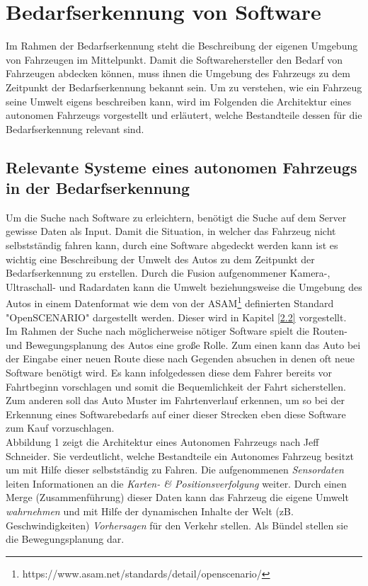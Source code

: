 \section{Bedarfserkennung von Software}
Im Rahmen der Bedarfserkennung steht die Beschreibung der eigenen Umgebung von Fahrzeugen im Mittelpunkt. Damit die Softwarehersteller den Bedarf von Fahrzeugen abdecken können, muss ihnen die Umgebung des Fahrzeugs zu dem Zeitpunkt der Bedarfserkennung bekannt sein. Um zu verstehen, wie ein Fahrzeug seine Umwelt eigens beschreiben kann, wird im Folgenden die Architektur eines autonomen Fahrzeugs vorgestellt und erläutert, welche Bestandteile dessen für die Bedarfserkennung relevant sind. 
\subsection{Relevante Systeme eines autonomen Fahrzeugs in der Bedarfserkennung}
Um die Suche nach Software zu erleichtern, benötigt die Suche auf dem Server gewisse Daten als Input. Damit die Situation, in welcher das Fahrzeug nicht selbstständig fahren kann, durch eine Software abgedeckt werden kann ist es wichtig eine Beschreibung der Umwelt des Autos zu dem Zeitpunkt der Bedarfserkennung zu erstellen. Durch die Fusion aufgenommener Kamera-, Ultraschall- und Radardaten kann die Umwelt beziehungsweise die Umgebung des Autos in einem Datenformat wie dem von der ASAM\footnote[1.]{https://www.asam.net/standards/detail/openscenario/} definierten Standard "OpenSCENARIO"\cite{b35} dargestellt werden. Dieser wird in Kapitel \ref{2.2} vorgestellt.\\
Im Rahmen der Suche nach möglicherweise nötiger Software spielt die Routen- und Bewegungsplanung des Autos eine große Rolle. Zum einen kann das Auto bei der Eingabe einer neuen Route diese nach Gegenden absuchen in denen oft neue Software benötigt wird. Es kann infolgedessen diese dem Fahrer bereits vor Fahrtbeginn vorschlagen und somit die Bequemlichkeit der Fahrt sicherstellen. Zum anderen soll das Auto  Muster im Fahrtenverlauf erkennen, um so bei der Erkennung eines Softwarebedarfs auf einer dieser Strecken eben diese Software zum Kauf vorzuschlagen.\\
Abbildung 1 zeigt die Architektur eines Autonomen Fahrzeugs nach Jeff Schneider. Sie verdeutlicht, welche Bestandteile ein Autonomes Fahrzeug besitzt um mit Hilfe dieser selbstständig zu Fahren. Die aufgenommenen \textit{Sensordaten} leiten Informationen an die \textit{Karten- \& Positionsverfolgung} weiter. Durch einen Merge (Zusammenführung) dieser Daten kann das Fahrzeug die eigene Umwelt \textit{wahrnehmen} und mit Hilfe der dynamischen Inhalte der Welt (zB. Geschwindigkeiten) \textit{Vorhersagen} für den Verkehr stellen. Als Bündel stellen sie die Bewegungsplanung dar.
